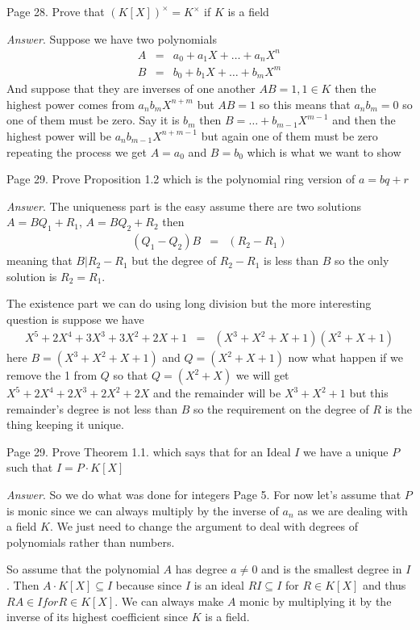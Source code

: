 \documentclass[aps,preprint,preprintnumbers,nofootinbib,showpacs,prd]{revtex4-1}
\newcommand{\nbea}{\begin{eqnarray*}}
\newcommand{\neea}{\end{eqnarray*}}
\begin{document}
Page 28. Prove that $(K[X])^{\times} = K^{\times}$ if $K$ is a field 

{\it Answer}. Suppose we have two polynomials 
%
\nbea
A & = & a_0 + a_1 X + \dots + a_n X^n \\
B & = & b_0 + b_1 X + \dots + b_m X^m
\neea
%
And suppose that they are inverses of one another $AB = 1, 1 \in K$ then the highest power comes from $a_n b_m X^{n + m}$ but $AB = 1$ so this means that $a_n b_m = 0$ so one of them must be zero. Say it is $b_m$ then $B = \dots + b_{m-1} X^{m - 1}$ and then the highest power will be $a_n b_{m-1} X^{n + m - 1}$ but again one of them must be zero repeating the process we get $A = a_0$ and $B = b_0$ which is what we want to show 

Page 29. Prove Proposition 1.2 which is the polynomial ring version of $a = bq + r$ 

{\it Answer}. The uniqueness part is the easy assume there are two solutions $A = BQ_1 + R_1$, $A = BQ_2 + R_2$ then 
%
\nbea
(Q_1 - Q_2) B & = & (R_2 - R_1) 
\neea
%
meaning that $B|R_2 - R_1$ but the degree of $R_2 - R_1$ is less than $B$ so the only solution is $R_2 = R_1$. 

The existence part we can do using long division but the more interesting question is suppose we have 
%
\nbea
 X^5 + 2X^4 + 3X^3 + 3X^2 + 2X + 1 & = & (X^3 + X^2 + X + 1)(X^2 + X + 1)
\neea
%
here $B = (X^3 + X^2 + X + 1)$ and $Q = (X^2 + X + 1)$ now what happen if we remove the 1 from $Q$ so that $Q = (X^2 + X)$ we will get $X^5 + 2X^4 + 2X^3 + 2X^2 + 2X$ and the remainder will be $X^3 + X^2 + 1$ but this remainder's degree is not less than $B$ so the requirement on the degree of $R$ is the thing keeping it unique. 

Page 29. Prove Theorem 1.1. which says that for an Ideal $I$ we have a unique $P$ such that $I = P \cdot K[X]$ 

{\it Answer}. So we do what was done for integers Page 5. For now let's assume that $P$ is monic since we can always multiply by the inverse of $a_n$ as we are dealing with a field $K$. We just need to change the argument to deal with degrees of polynomials rather than numbers. 

So assume that the polynomial $A$ has degree $a \neq 0$ and is the smallest degree in $I$. Then $A \cdot K[X] \subseteq I$ because since $I$ is an ideal $RI \subseteq I$ for $R \in K[X]$ and thus $RA \in I for R \in K[X]$. We can always make $A$ monic by multiplying it by the inverse of its highest coefficient since $K$ is a field. 
\end{document}
